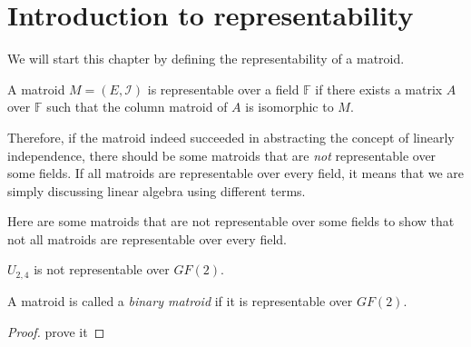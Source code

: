 \section{Introduction to representability}

%

We will start this chapter by defining the representability of a matroid.

\begin{defn}
A matroid $M = (E, \mathcal{I})$ is representable over a field $\mathbb{F}$ if 
there exists a matrix $A$ over $\mathbb{F}$ such that the column matroid of $A$ is isomorphic to $M$.
\end{defn}

Therefore, if the matroid indeed succeeded in abstracting the concept of linearly independence, 
there should be some matroids that are \textit{not} representable over some fields.
If all matroids are representable over every field, it means that we are simply discussing linear algebra using different terms.

Here are some matroids that are not representable over some fields to show that not all matroids are representable over every field.


\begin{thm}
$U_{2, 4}$ is not representable over $GF(2)$.
\end{thm}

A matroid is called a \textit{binary matroid} if it is representable over $GF(2)$.

\begin{proof}
prove it
\end{proof}


